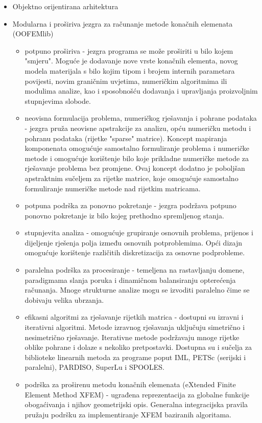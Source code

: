 \documentclass[a4paper,twoside,12pt]{memoir} %
\begin{document}
\begin{itemize}
    \item Objektno orijentirana arhitektura
    \item Modularna i proširiva jezgra za računanje metode konačnih elemenata (OOFEMlib)
    \begin{itemize}
        \item potpuno proširiva - jezgra programa se može proširiti u bilo kojem "smjeru". Moguće je dodavanje nove vrste konačnih elementa, novog modela materijala s bilo kojim tipom i brojem internih parametara povijesti, novim graničnim uvjetima, numeričkim algoritmima ili modulima analize, kao i sposobnošću dodavanja i upravljanja proizvoljnim stupnjevima slobode.
        \item neovisna formulacija problema, numeričkog rješavanja i pohrane podataka - jezgra pruža neovisne apstrakcije za analizu, opću numeričku metodu i pohranu podataka (rijetke "sparse" matrice). Koncept mapiranja komponenata omogućuje samostalno formuliranje problema i numeričke metode i omogućuje korištenje bilo koje prikladne numeričke metode za rješavanje problema bez promjene. Ovaj koncept dodatno je poboljšan apstraktnim sučeljem za rijetke matrice, koje omogućuje samostalno formuliranje numeričke metode nad rijetkim matricama.
        \item potpuna podrška za ponovno pokretanje - jezgra podržava potpuno ponovno pokretanje iz bilo kojeg prethodno spremljenog stanja.
        \item stupnjevita analiza - omogućuje grupiranje osnovnih problema, prijenos i dijeljenje rješenja polja između osnovnih potproblemima. Opći dizajn omogućuje korištenje različitih diskretizacija za osnovne podprobleme.
        \item paralelna podrška za procesiranje - temeljena na rastavljanju domene, paradigmama slanja poruka i dinamičnom balansiranju opterećenja računanja. Mnoge strukturne analize mogu se izvoditi paralelno čime se dobivaju velika ubrzanja.
        \item efikasni algoritmi za rješavanje rijetkih matrica - dostupni su izravni i iterativni algoritmi. Metode izravnog rješavanja uključuju simetrično i nesimetrično rješavanje. Iterativne metode podržavaju mnoge rijetke oblike pohrane i dolaze s nekoliko pretpostavki. Dostupna su i sučelja za biblioteke linearnih metoda za programe poput IML, PETSc (serijski i paralelni), PARDISO, SuperLu i SPOOLES.
        \item podrška za proširenu metodu konačnih elemenata (eXtended Finite Element Method XFEM) - ugrađena reprezentacija za globalne funkcije obogaćivanja i njihov geometrijski opis. Generalna integracijska pravila pružaju podršku za implementiranje XFEM baziranih algoritama.

\end{itemize}
\end{itemize}
\end{document}
